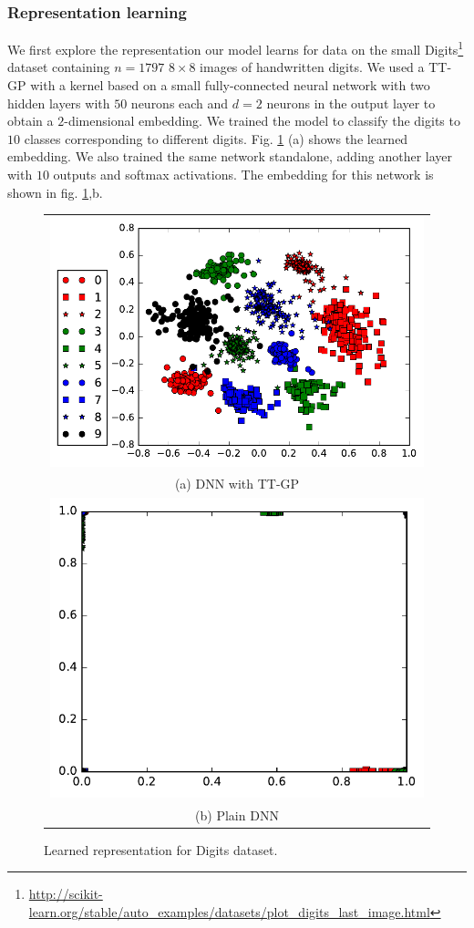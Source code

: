   \subsubsection{Representation learning}
  We first explore the representation our model learns for data on the small
  Digits\footnote{\url{http://scikit-learn.org/stable/auto_examples/datasets/plot_digits_last_image.html}}
  dataset containing $n = 1797$ $8 \times 8$ images of handwritten digits. We
  used a TT-GP with a kernel based on a small fully-connected neural network
  with two hidden layers with $50$ neurons each and $d = 2$ neurons in the output
  layer to obtain a $2$-dimensional embedding. We trained the model to classify
  the digits to $10$ classes corresponding to different digits.
  Fig. \ref{digits_embedding} (a) shows the learned embedding. We also trained the same
  network standalone, adding another layer with $10$ outputs and softmax
  activations. The embedding for this network is shown in fig. \ref{digits_embedding},b.
\begin{figure}[!t]
  \begin{center}
      \begin{tabular}{c}
          \hspace{-.9cm}\includegraphics[height=0.45\linewidth]{pics/embedding_ttgp.pdf} \\
          (a) DNN with TT-GP \\
          \includegraphics[height=0.45\linewidth]{pics/embedding_dnn.pdf}\\
          (b) Plain DNN\\
      \end{tabular}
  \end{center}
  \vspace{-0.4cm}
  \caption{Learned representation for Digits dataset.}
  \vspace{-0.4cm}
  \label{digits_embedding}
\end{figure}

